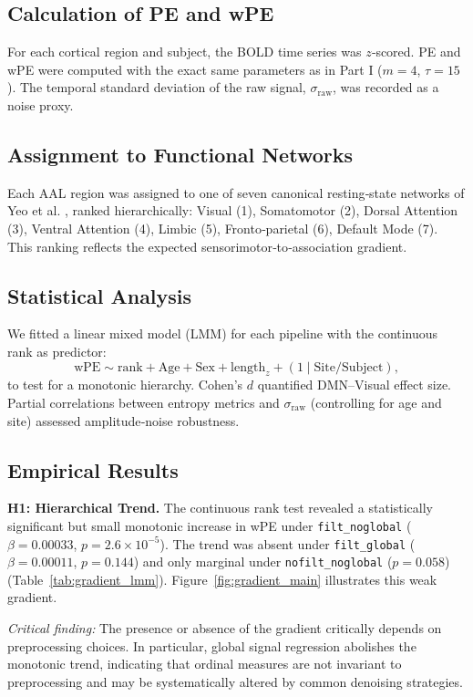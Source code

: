 \documentclass[12pt,a4paper]{article}
\begin{document}
	\subsection{Calculation of PE and wPE}
	For each cortical region and subject, the BOLD time series was $z$‑scored. PE and wPE were computed with the exact same parameters as in Part I ($m=4$, $\tau=15$). The temporal standard deviation of the raw signal, $\sigma_{\text{raw}}$, was recorded as a noise proxy.
	
	\subsection{Assignment to Functional Networks}
	Each AAL region was assigned to one of seven canonical resting‑state networks of Yeo et al. \cite{yeo2011}, ranked hierarchically: Visual (1), Somatomotor (2), Dorsal Attention (3), Ventral Attention (4), Limbic (5), Fronto‑parietal (6), Default Mode (7). This ranking reflects the expected sensorimotor‑to‑association gradient.
	
	\subsection{Statistical Analysis}
	We fitted a linear mixed model (LMM) for each pipeline with the continuous rank as predictor:
	\begin{equation}
		\text{wPE} \sim \text{rank} + \text{Age} + \text{Sex} + \text{length}_z + (1 \mid \text{Site}/\text{Subject}),
	\end{equation}
	to test for a monotonic hierarchy. Cohen's $d$ quantified DMN–Visual effect size. Partial correlations between entropy metrics and $\sigma_{\text{raw}}$ (controlling for age and site) assessed amplitude‑noise robustness.
	
	\subsection{Empirical Results}
	
	\textbf{H1: Hierarchical Trend.} The continuous rank test revealed a statistically significant but small monotonic increase in wPE under \texttt{filt\_noglobal} ($\beta = 0.00033$, $p = 2.6\times10^{-5}$). The trend was absent under \texttt{filt\_global} ($\beta = 0.00011$, $p = 0.144$) and only marginal under \texttt{nofilt\_noglobal} ($p = 0.058$) (Table~\ref{tab:gradient_lmm}). Figure~\ref{fig:gradient_main} illustrates this weak gradient.
	
	\noindent\textit{Critical finding:} The presence or absence of the gradient critically depends on preprocessing choices. In particular, global signal regression abolishes the monotonic trend, indicating that ordinal measures are not invariant to preprocessing and may be systematically altered by common denoising strategies.
	
\end{document}

